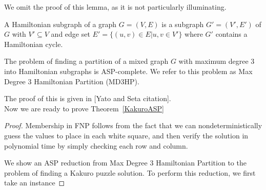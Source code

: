 \documentclass[runningheads,a4paper]{llncs}
\begin{document}
We omit the proof of this lemma, as it is not particularly illuminating.

\begin{definition}
A Hamiltonian subgraph of a graph $G = (V,E)$ is a subgraph $G' = (V',E')$ of $G$ with $V' \subseteq V$ and edge set $E' = \{(u,v) \in E | u,v \in V'\}$ where $G'$ contains a Hamiltonian cycle.
\end{definition}

\begin{theorem}
The problem of finding a partition of a mixed graph $G$ with maximum degree 3 into Hamiltonian subgraphs is ASP-complete. We refer to this problem as Max Degree 3 Hamiltonian Partition (MD3HP).
\end{theorem}

The proof of this is given in [Yato and Seta citation].\\

Now we are ready to prove Theorem~\ref{KakuroASP}

\begin{proof}
Membership in FNP follows from the fact that we can nondeterministically guess the values to place in each white square, and then verify the solution in polynomial time by simply checking each row and column.

We show an ASP reduction from Max Degree 3 Hamiltonian Partition to the problem of finding a Kakuro puzzle solution. To perform this reduction, we first take an instance 
\end{proof}



\end{document}
